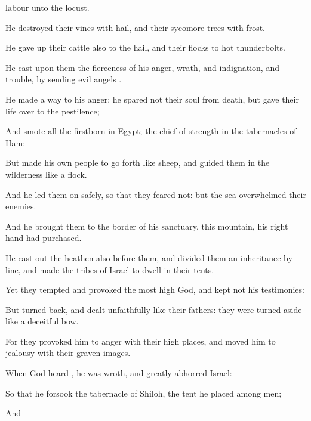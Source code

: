 {labour unto the
locust.
\par }{\Q {}He
destroyed their
vines with
hail, and their sycomore
trees with
frost.
\par }{\Q {}He gave
up their
cattle also to the
hail, and their
flocks to hot
thunderbolts.
\par }{\Q {}He
cast upon them the
fierceness of his
anger,
wrath, and
indignation, and
trouble, by
sending
evil
angels
{}.
\par }{\Q {}He
made a
way to his
anger; he
spared not their
soul from
death, but
gave their
life
over to the
pestilence;
\par }{\Q {}And
smote all the
firstborn in
Egypt; the
chief of
{}
strength in the
tabernacles of
Ham:
\par }{\Q {}But made his own
people to go
forth like
sheep, and
guided them in the
wilderness like a
flock.
\par }{\Q {}And he
led them on
safely, so that they
feared not: but the
sea
overwhelmed their
enemies.
\par }{\Q {}And he
brought them to the
border of his
sanctuary,
{} this
mountain,
{} his right
hand had
purchased.
\par }{\Q {}He cast
out the
heathen also
before them, and
divided them an
inheritance by
line, and made the
tribes of
Israel to
dwell in their
tents.
\par }{\Q {}Yet they
tempted and
provoked the most
high
God, and
kept not his
testimonies:
\par }{\Q {}But turned
back, and dealt
unfaithfully like their
fathers: they were turned
aside like a
deceitful
bow.
\par }{\Q {}For they provoked him to
anger with their high
places, and moved him to
jealousy with their graven
images.
\par }{\Q {}When
God
heard
{}, he was
wroth, and
greatly
abhorred
Israel:
\par }{\Q {}So that he
forsook the
tabernacle of
Shiloh, the
tent
{} he
placed among
men;
\par }{\Q {}And
}
